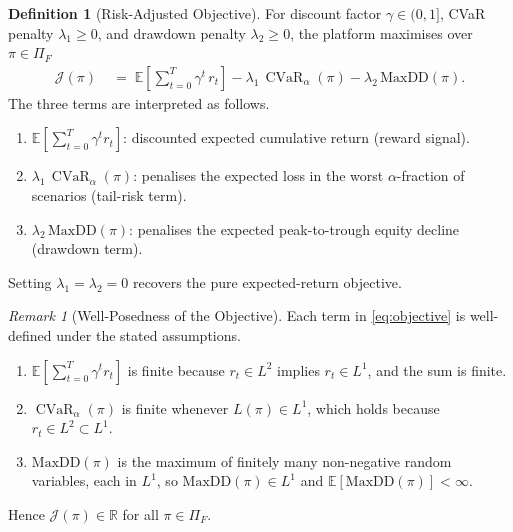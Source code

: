 \documentclass[12pt,openany]{book}
\newcommand{\MaxDD}{\mathrm{MaxDD}}
\newcommand{\E}{\mathbb{E}}
\numberwithin{equation}{chapter}
\theoremstyle{plain}
\theoremstyle{definition}
\newtheorem{definition}[theorem]{Definition}
\theoremstyle{remark}
\newtheorem{remark}[theorem]{Remark}
\numberwithin{equation}{chapter}
\theoremstyle{plain}
\DeclareMathOperator{\CVaR}{CVaR}
\begin{document}
\begin{definition}[Risk-Adjusted Objective]
\label{def:objective}
For discount factor $\gamma \in (0,1]$, CVaR penalty
$\lambda_1 \geq 0$, and drawdown penalty $\lambda_2 \geq 0$, the
platform maximises over $\pi \in \Pi_F$
\begin{align}
  \mathcal{J}(\pi)
  &\;=\;
  \E\!\left[\sum_{t=0}^{T}\gamma^t\,r_t\right]
  - \lambda_1\,\CVaR_\alpha(\pi)
  - \lambda_2\,\MaxDD(\pi).
  \label{eq:objective}
\end{align}
The three terms are interpreted as follows.
\begin{enumerate}
  \item $\E\!\left[\sum_{t=0}^{T}\gamma^t r_t\right]$: discounted
        expected cumulative return (reward signal).
  \item $\lambda_1\,\CVaR_\alpha(\pi)$: penalises the expected loss in
        the worst $\alpha$-fraction of scenarios (tail-risk term).
  \item $\lambda_2\,\MaxDD(\pi)$: penalises the expected peak-to-trough
        equity decline (drawdown term).
\end{enumerate}
Setting $\lambda_1 = \lambda_2 = 0$ recovers the pure
expected-return objective.
\end{definition}

\begin{remark}[Well-Posedness of the Objective]
\label{rem:obj-wellposed}
Each term in \eqref{eq:objective} is well-defined under the stated
assumptions.
\begin{enumerate}
  \item $\E[\sum_{t=0}^{T}\gamma^t r_t]$ is finite because $r_t \in
        L^2$ implies $r_t \in L^1$, and the sum is finite.
  \item $\CVaR_\alpha(\pi)$ is finite whenever $L(\pi) \in L^1$, which
        holds because $r_t \in L^2 \subset L^1$.
  \item $\MaxDD(\pi)$ is the maximum of finitely many
        non-negative random variables, each in $L^1$, so
        $\MaxDD(\pi) \in L^1$ and $\E[\MaxDD(\pi)] < \infty$.
\end{enumerate}
Hence $\mathcal{J}(\pi) \in \mathbb{R}$ for all $\pi \in \Pi_F$.
\end{remark}
\end{document}
